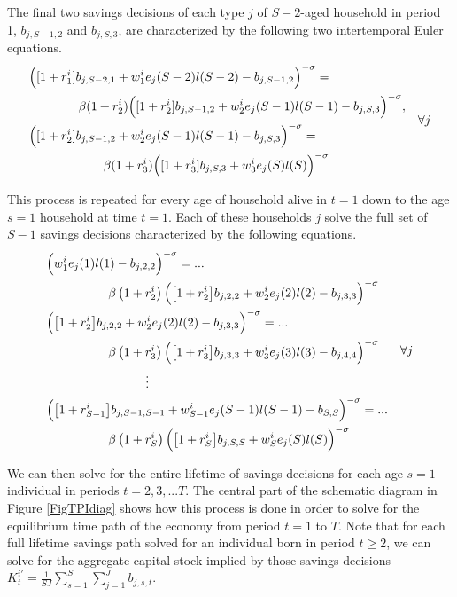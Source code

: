 \documentclass[letterpaper,12pt]{article}
\theoremstyle{definition}
\begin{document}
  The final two savings decisions of each type $j$ of $S-2$-aged household in period 1, $b_{j,S-1,2}$ and $b_{j,S,3}$, are characterized by the following two intertemporal Euler equations.
  \begin{equation}\label{EqEulerSm2p1}
    \begin{split}
      &\Bigl([1+r_1^i]b_{j,S-2,1} + w_1^i e_j(S-2)l(S-2) - b_{j,S-1,2}\Bigr)^{-\sigma} = \\
      &\quad\quad\quad\quad \beta(1+r_2^i)\Bigl([1+r_2^i]b_{j,S-1,2} + w_2^i e_j(S-1)l(S-1) - b_{j,S,3}\Bigr)^{-\sigma}, \\
      &\Bigl([1+r_2^i]b_{j,S-1,2} + w_2^i e_j(S-1)l(S-1) - b_{j,S,3}\Bigr)^{-\sigma} = \\
      &\quad\quad\quad\quad\quad\quad \beta(1+r_3^i)\Bigl([1+r_3^i]b_{j,S,3} + w_3^i e_j(S)l(S)\Bigr)^{-\sigma}
    \end{split} \quad\forall j
  \end{equation}

  This process is repeated for every age of household alive in $t=1$ down to the age $s=1$ household at time $t=1$. Each of these households $j$ solve the full set of $S-1$ savings decisions characterized by the following equations.
  \begin{equation}\label{EqEulerFullp1}
    \begin{split}
      &\Bigl(w_1^i e_j(1)l(1) - b_{j,2,2}\Bigr)^{-\sigma} = ... \\
      &\quad\quad\quad\quad\quad \beta\left(1+r_2^i\right)\Bigl(\bigl[1+r_2^i\bigr]b_{j,2,2} + w_2^i e_j(2)l(2) - b_{j,3,3}\Bigr)^{-\sigma} \\
      &\Bigl(\bigl[1+r_2^i\bigr]b_{j,2,2} + w_2^i e_j(2)l(2) - b_{j,3,3}\Bigr)^{-\sigma} = ... \\
      &\quad\quad\quad\quad\quad \beta\left(1 + r_3^i\right)\Bigl(\bigl[1+r_3^i\bigr]b_{j,3,3} + w_3^i e_j(3)l(3) - b_{j,4,4}\Bigr)^{-\sigma} \\
      &\quad\quad\quad\quad\quad\quad\quad\quad\vdots \\
      &\Bigl(\bigl[1 + r_{S-1}^i\bigr]b_{j,S-1,S-1} + w_{S-1}^i e_j(S-1)l(S-1) - b_{S,S}\Bigr)^{-\sigma} = ... \\
      &\quad\quad\quad\quad\quad \beta\left(1 + r_S^i\right)\Bigl(\bigl[1+r_S^i\bigr]b_{j,S,S} + w_S^i e_j(S)l(S)\Bigr)^{-\sigma}
    \end{split}\quad\forall j
  \end{equation}

  We can then solve for the entire lifetime of savings decisions for each age $s=1$ individual in periods $t=2,3,...T$. The central part of the schematic diagram in Figure \ref{FigTPIdiag} shows how this process is done in order to solve for the equilibrium time path of the economy from period $t=1$ to $T$. Note that for each full lifetime savings path solved for an individual born in period $t\geq 2$, we can solve for the aggregate capital stock implied by those savings decisions $K_t^{i'}=\frac{1}{SJ}\sum_{s=1}^S\sum_{j=1}^J b_{j,s,t}$.
\end{document}
